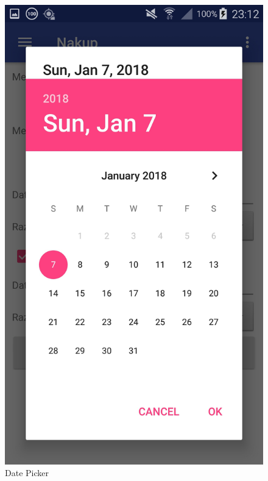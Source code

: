 \documentclass[11pt,a4paper]{article}
\begin{document}
\begin{figure}[htb]
	\centerline{\includegraphics[width=1.0\textwidth]{GUI/datePicker.jpg}}
	\caption{Date Picker}
	\label{sl:koncept}
\end{figure}







\end{document}
